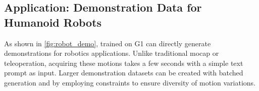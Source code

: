 \subsection{Application: Demonstration Data for Humanoid Robots}
\label{sec:key_results:robot}

As shown in \cref{fig:robot_demo}, \model trained on G1 can directly generate demonstrations for robotics applications. Unlike traditional mocap or teleoperation, acquiring these motions takes a few seconds with a simple text prompt as input. Larger demonstration datasets can be created with batched generation and by employing constraints to ensure diversity of motion variations.

